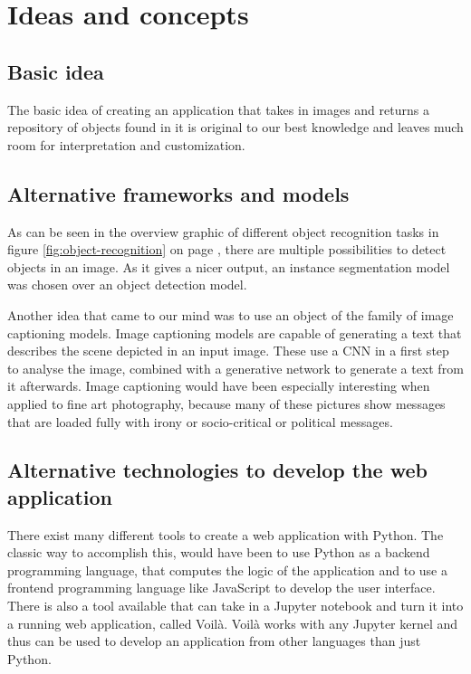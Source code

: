 \chapter{Ideas and concepts}

\section{Basic idea}

The basic idea of creating an application that takes in images and returns a repository of objects found in it is original to our best knowledge and leaves much room for interpretation and customization.

\section{Alternative frameworks and models}

As can be seen in the overview graphic of different object recognition tasks in figure \ref{fig:object-recognition} on page \pageref{fig:object-recognition}, there are multiple possibilities to detect objects in an image. As it gives a nicer output, an instance segmentation model was chosen over an object detection model.

Another idea that came to our mind was to use an object of the family of image captioning models. Image captioning models are capable of generating a text that describes the scene depicted in an input image. These use a CNN in a first step to analyse the image, combined with a generative network to generate a text from it afterwards. Image captioning would have been especially interesting when applied to fine art photography, because many of these pictures show messages that are loaded fully with irony or socio-critical or political messages.

\section{Alternative technologies to develop the web application}

There exist many different tools to create a web application with Python. The classic way to accomplish this, would have been to use Python as a backend programming language, that computes the logic of the application and to use a frontend programming language like JavaScript to develop the user interface. There is also a tool available that can take in a Jupyter notebook and turn it into a running web application, called Voilà. Voilà works with any Jupyter kernel and thus can be used to develop an application from other languages than just Python.

